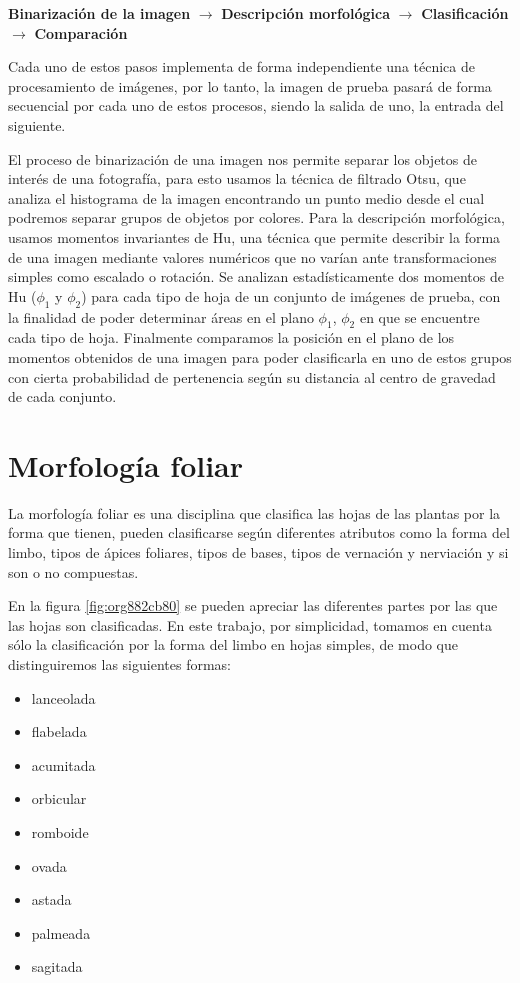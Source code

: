 \documentclass[letter]{article}
\begin{document}
\begin{center}
\textbf{Binarización de la imagen} \(\rightarrow\) \textbf{Descripción morfológica} \(\rightarrow\)
 \textbf{Clasificación} \(\rightarrow\) \textbf{Comparación}
\end{center}

Cada uno de estos pasos implementa de forma independiente una técnica de
procesamiento de imágenes, por lo tanto, la imagen de prueba pasará de forma
secuencial por cada uno de estos procesos, siendo la salida de uno, la entrada
del siguiente.

El proceso de binarización de una imagen nos permite separar los objetos de
interés de una fotografía, para esto usamos la técnica de filtrado Otsu, que
analiza el histograma de la imagen encontrando un punto medio desde el cual
podremos separar grupos de objetos por colores. Para la descripción morfológica,
usamos momentos invariantes de Hu, una técnica que permite describir la forma de
una imagen mediante valores numéricos que no varían ante transformaciones
simples como escalado o rotación. Se analizan estadísticamente dos momentos de
Hu (\(\phi_1\) y \(\phi_2\)) para cada tipo de hoja de un conjunto de imágenes de
prueba, con la finalidad de poder determinar áreas en el plano \(\phi_1\), \(\phi_2\)
en que se encuentre cada tipo de hoja. Finalmente comparamos la posición en el
plano de los momentos obtenidos de una imagen para poder clasificarla en uno de
estos grupos con cierta probabilidad de pertenencia según su distancia al
centro de gravedad de cada conjunto.

\section{Morfología foliar}
\label{sec:org1ae6688}
La morfología foliar es una disciplina que clasifica las hojas de las plantas
por la forma que tienen, pueden clasificarse según diferentes atributos como la
forma del limbo, tipos de ápices foliares, tipos de bases, tipos de vernación y
nerviación y si son o no compuestas.

En la figura \ref{fig:org882cb80} se pueden apreciar las diferentes partes por las que las
hojas son clasificadas. En este trabajo, por simplicidad, tomamos en cuenta sólo
la clasificación por la forma del limbo en hojas simples, de modo que
distinguiremos las siguientes formas:

\begin{itemize}
\item lanceolada
\item flabelada
\item acumitada
\item orbicular
\item romboide
\item ovada
\item astada
\item palmeada
\item sagitada
\end{itemize}
\end{document}
